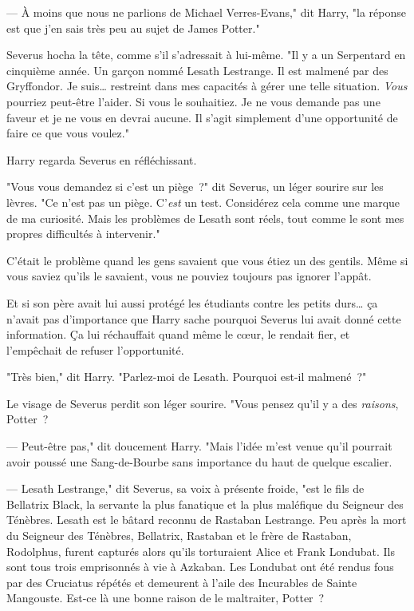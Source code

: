 --- À moins que nous ne parlions de Michael Verres-Evans," dit Harry, "la réponse est que j'en sais très peu au sujet de James Potter."

Severus hocha la tête, comme s'il s'adressait à lui-même. "Il y a un Serpentard en cinquième année. Un garçon nommé Lesath Lestrange. Il est malmené par des Gryffondor. Je suis… restreint dans mes capacités à gérer une telle situation. \emph{Vous} pourriez peut-être l'aider. Si vous le souhaitiez. Je ne vous demande pas une faveur et je ne vous en devrai aucune. Il s'agit simplement d'une opportunité de faire ce que vous voulez."

Harry regarda Severus en réfléchissant.

"Vous vous demandez si c'est un piège~?" dit Severus, un léger sourire sur les lèvres. "Ce n'est pas un piège. C'\emph{est} un test. Considérez cela comme une marque de ma curiosité. Mais les problèmes de Lesath sont réels, tout comme le sont mes propres difficultés à intervenir."

C'était le problème quand les gens savaient que vous étiez un des gentils. Même si vous saviez qu'ils le savaient, vous ne pouviez toujours pas ignorer l'appât.

Et si son père avait lui aussi protégé les étudiants contre les petits durs… ça n'avait pas d'importance que Harry sache pourquoi Severus lui avait donné cette information. Ça lui réchauffait quand même le cœur, le rendait fier, et l'empêchait de refuser l'opportunité.

"Très bien," dit Harry. "Parlez-moi de Lesath. Pourquoi est-il malmené~?"

Le visage de Severus perdit son léger sourire. "Vous pensez qu'il y a des \emph{raisons}, Potter~?

--- Peut-être pas," dit doucement Harry. "Mais l'idée m'est venue qu'il pourrait avoir poussé une Sang-de-Bourbe sans importance du haut de quelque escalier.

--- Lesath Lestrange," dit Severus, sa voix à présente froide, "est le fils de Bellatrix Black, la servante la plus fanatique et la plus maléfique du Seigneur des Ténèbres. Lesath est le bâtard reconnu de Rastaban Lestrange. Peu après la mort du Seigneur des Ténèbres, Bellatrix, Rastaban et le frère de Rastaban, Rodolphus, furent capturés alors qu'ils torturaient Alice et Frank Londubat. Ils sont tous trois emprisonnés à vie à Azkaban. Les Londubat ont été rendus fous par des Cruciatus répétés et demeurent à l'aile des Incurables de Sainte Mangouste. Est-ce là une bonne raison de le maltraiter, Potter~?

